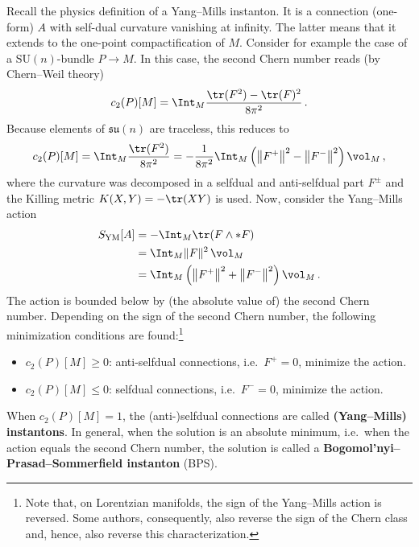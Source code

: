     Recall the physics definition of a Yang--Mills instanton. It is a connection (one-form) $A$ with self-dual curvature vanishing at infinity. The latter means that it extends to the one-point compactification of $M$. Consider for example the case of a $\mathrm{SU}(n)$-bundle $P\rightarrow M$. In this case, the second Chern number reads (by Chern--Weil theory)
    \begin{gather}
        c_2(P)[M] = \Int_M\frac{\tr(F^2)-\tr(F)^2}{8\pi^2}\,.
    \end{gather}
    Because elements of $\mathfrak{su}(n)$ are traceless, this reduces to
    \begin{gather}
        c_2(P)[M] = \Int_M\frac{\tr(F^2)}{8\pi^2}=-\frac{1}{8\pi^2}\Int_M\left(\left\|F^+\right\|^2-\left\|F^-\right\|^2\right)\vol_M\,,
    \end{gather}
    where the curvature was decomposed in a selfdual and anti-selfdual part $F^\pm$ and the Killing metric $K(X,Y)=-\tr(XY)$ is used. Now, consider the Yang--Mills action
    \begin{gather}
        \begin{aligned}
            S_{\text{YM}}[A] &= -\Int_M\tr(F\wedge\ast F)\\
            &= \Int_M\|F\|^2\,\vol_M\\
            &= \Int_M\left(\left\|F^+\right\|^2+\left\|F^-\right\|^2\right)\vol_M\,.
        \end{aligned}
    \end{gather}
    The action is bounded below by (the absolute value of) the second Chern number. Depending on the sign of the second Chern number, the following minimization conditions are found:\footnote{Note that, on Lorentzian manifolds, the sign of the Yang--Mills action is reversed. Some authors, consequently, also reverse the sign of the Chern class and, hence, also reverse this characterization.}
    \begin{itemize}
        \item $c_2(P)[M]\geq0$: anti-selfdual connections, i.e.~$F^+=0$, minimize the action.
        \item $c_2(P)[M]\leq0$: selfdual connections, i.e.~$F^-=0$, minimize the action.
    \end{itemize}
    When $c_2(P)[M]=1$, the (anti-)selfdual connections are called \textbf{(Yang--Mills) instantons}. In general, when the solution is an absolute minimum, i.e.~when the action equals the second Chern number, the solution is called a \textbf{Bogomol'nyi--Prasad--Sommerfield instanton} (BPS). 

